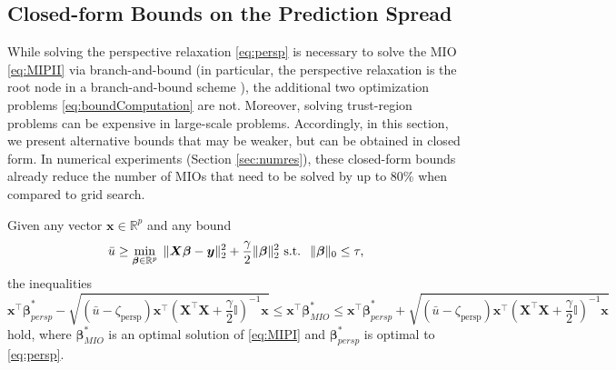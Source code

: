 \documentclass[mnsc,nonblindrev]{informs3} %
\newcommand{\ag}[1]{{\color{black}#1}}
\begin{document}

\subsection{Closed-form Bounds on the Prediction Spread}
\ag{While solving the perspective relaxation \eqref{eq:persp} is necessary to solve the MIO \eqref{eq:MIPII} via branch-and-bound (in particular, the perspective relaxation is the root node in a branch-and-bound scheme \citep{mazumder2023subset}), the additional two optimization problems \eqref{eq:boundComputation} are not. Moreover, solving trust-region problems can be expensive in large-scale problems. Accordingly, in this section, we present alternative bounds that may be weaker, but can be obtained in closed form. In numerical experiments (Section \ref{sec:numres}), these closed-form bounds already reduce the number of MIOs that need to be solved by up to 
80\% when compared to grid search.}

\begin{theorem}\label{prop:l10UB}
	Given any vector $\bm{x}\in \mathbb{R}^p$ and any bound
	\begin{equation}\label{eq:MIPI}
			\bar u\geq \min_{\bm{\beta}\in \mathbb{R}^p}\; \|\bm{X}\bm{\beta}-\bm{y}\|_2^2+\frac{\gamma}{2}\|\bm{\beta}\|_2^2
			\text{\rm\ s.t. }\; \|\bm{\beta}\|_0\leq \tau,
	\end{equation} 
	the inequalities
	\small
	$$\bm{x^\top\beta}_{persp}^*-\sqrt{\left(\bar u-\zeta_{\text{persp}}\right)\bm{x^\top}\left(\bm{X^\top X}+\frac{\gamma}{2}\mathbb{I}\right)^{-1}\bm{x}}\leq \bm{x}^\top \bm{\beta}_{MIO}^*\leq  \bm{x^\top\beta}_{persp}^*+\sqrt{\left(\bar u-\zeta_{\text{persp}}\right)\bm{x^\top}\left(\bm{X^\top X}+\frac{\gamma}{2}\mathbb{I}\right)^{-1}\bm{x}}$$\normalsize
	hold, where $\bm{\beta}_{MIO}^*$ is an optimal solution of \eqref{eq:MIPI} and $\bm{\beta}_{persp}^*$ is optimal to \eqref{eq:persp}.
\end{theorem}
\end{document}
